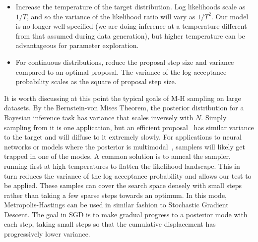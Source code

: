 \documentclass[twoside]{article} \usepackage{aistats2017}
\begin{document}
\begin{itemize}[noitemsep]
    \item Increase the temperature of the target distribution. Log likelihoods
    scale as $1/T$, and so the variance of the likelihood ratio will vary as
    $1/T^2$. Our model is no longer well-specified (we are doing inference at a
    temperature different from that assumed during data generation), but higher
    temperature can be advantageous for parameter exploration.


    \item For continuous distributions, reduce the proposal step size and
    variance compared to an optimal proposal. The variance of the log acceptance
    probability scales as the square of proposal step size. 

\end{itemize}

It is worth discussing at this point the typical goals of M-H sampling on large
datasets. By the Bernstein-von Mises Theorem, the posterior distribution for a
Bayesian inference task has variance that scales inversely with $N$. Simply
sampling from it is one application, but an efficient
proposal~\citep{OptimalScaling01} has similar variance to the target and will
diffuse to it extremely slowly. For applications to neural networks or models
where the posterior is multimodal~\citep{choromanska2014loss}, samplers will
likely get trapped in one of the modes. A common solution is to anneal the
sampler, running first at high temperatures to flatten the likelihood landscape.
This in turn reduces the variance of the log acceptance probability and allows
our test to be applied. These samples can cover the search space densely with
small steps rather than taking a few sparse steps towards an optimum. In this
mode, Metropolis-Hastings can be used in similar fashion to Stochastic Gradient
Descent. The goal in SGD is to make gradual progress to a posterior mode with
each step, taking small steps so that the cumulative displacement has
progressively lower variance.

\end{document}
